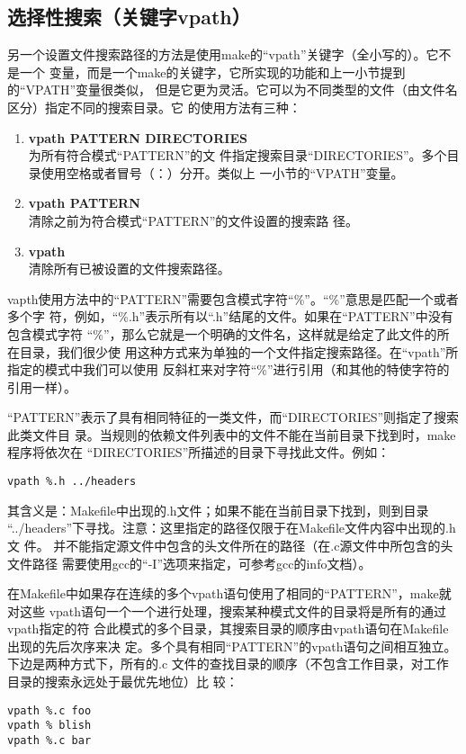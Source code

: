 \subsection{选择性搜索（关键字vpath）}
另一个设置文件搜索路径的方法是使用make的“vpath”关键字（全小写的）。它不是一个
变量，而是一个make的关键字，它所实现的功能和上一小节提到的“VPATH”变量很类似，
但是它更为灵活。它可以为不同类型的文件（由文件名区分）指定不同的搜索目录。它
的使用方法有三种：

\begin{enumerate}
\itemsep=0pt \parskip=0pt
\item      \textbf{vpath PATTERN DIRECTORIES}\\为所有符合模式“PATTERN”的文
    件指定搜索目录“DIRECTORIES”。多个目录使用空格或者冒号（：）分开。类似上
    一小节的“VPATH”变量。

\item \textbf{vpath PATTERN}\\清除之前为符合模式“PATTERN”的文件设置的搜索路
    径。

\item       \textbf{vpath}\\清除所有已被设置的文件搜索路径。
\end{enumerate}

vapth使用方法中的“PATTERN”需要包含模式字符“\%”。“\%”意思是匹配一个或者多个字
符，例如，“\%.h”表示所有以“.h”结尾的文件。如果在“PATTERN”中没有包含模式字符
“\%”，那么它就是一个明确的文件名，这样就是给定了此文件的所在目录，我们很少使
用这种方式来为单独的一个文件指定搜索路径。在“vpath”所指定的模式中我们可以使用
反斜杠来对字符“\%”进行引用（和其他的特使字符的引用一样）。

“PATTERN”表示了具有相同特征的一类文件，而“DIRECTORIES”则指定了搜索此类文件目
录。当规则的依赖文件列表中的文件不能在当前目录下找到时，make程序将依次在
“DIRECTORIES”所描述的目录下寻找此文件。例如：

\begin{Verbatim}[]
vpath %.h ../headers
\end{Verbatim}


其含义是：Makefile中出现的.h文件；如果不能在当前目录下找到，则到目录
“../headers”下寻找。注意：这里指定的路径仅限于在Makefile文件内容中出现的.h文
件。 并不能指定源文件中包含的头文件所在的路径（在.c源文件中所包含的头文件路径
需要使用gcc的“-I”选项来指定，可参考gcc的info文档）。

在Makefile中如果存在连续的多个vpath语句使用了相同的“PATTERN”，make就对这些
vpath语句一个一个进行处理，搜索某种模式文件的目录将是所有的通过vpath指定的符
合此模式的多个目录，其搜索目录的顺序由vpath语句在Makefile出现的先后次序来决
定。多个具有相同“PATTERN”的vpath语句之间相互独立。下边是两种方式下，所有的.c
文件的查找目录的顺序（不包含工作目录，对工作目录的搜索永远处于最优先地位）比
较：
\begin{Verbatim}[]
vpath %.c foo
vpath % blish
vpath %.c bar
\end{Verbatim}

